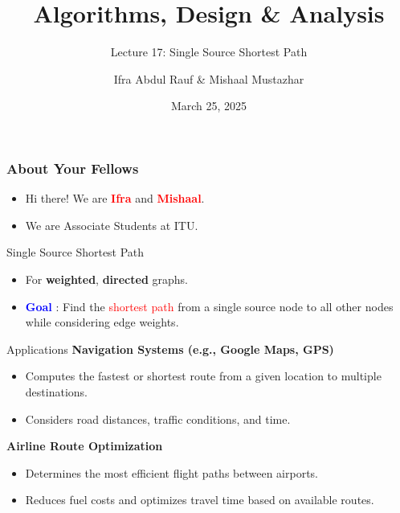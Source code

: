 \documentclass{beamer}
\title{Algorithms, Design \& Analysis}
\subtitle{Lecture 17: Single Source Shortest Path}
\author{Ifra Abdul Rauf \& Mishaal Mustazhar}
\institute{Information Technology University}
\date{March 25, 2025}
\begin{document}
    \begin{frame}
        \titlepage
    \end{frame}
    
    \begin{frame}
        \frametitle{About Your Fellows}
        \begin{itemize}
            \item Hi there! We are \textcolor{red}{\textbf{Ifra}} {and }\textcolor{red}{\textbf{Mishaal}}.
            \item We are Associate Students at ITU.
        \end{itemize}
    \end{frame}
    
    \begin{frame}{Single Source Shortest Path}
        \begin{itemize}
            \item For \textbf{weighted}, \textbf{directed} graphs.
            \item \textbf{\textcolor{blue}{Goal}} : Find the \textcolor{red}{shortest path} from a single source node to all other nodes while considering edge weights.
        \end{itemize}
    \end{frame}
    
    \begin{frame}{Applications}
        \textbf{Navigation Systems (e.g., Google Maps, GPS)}
        \begin{itemize}
            \item Computes the fastest or shortest route from a given location to multiple destinations.
            \item Considers road distances, traffic conditions, and time.
        \end{itemize}
        \textbf{Airline Route Optimization}
        \begin{itemize}
            \item Determines the most efficient flight paths between airports.
            \item Reduces fuel costs and optimizes travel time based on available routes.
        \end{itemize}
    \end{frame}
    
\end{document}
